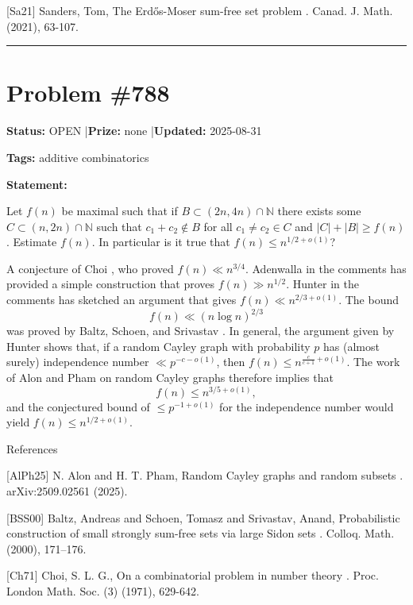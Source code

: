 \documentclass{article}
\begin{document}
[Sa21] Sanders, Tom, The Erd\H{o}s-Moser sum-free set problem . Canad. J. Math. (2021), 63-107.

\noindent\rule{\linewidth}{0.4pt}


\section{Problem \#788}
\label{prob:788}

\noindent\textbf{Status:} OPEN \quad|\quad \textbf{Prize:} none \quad|\quad \textbf{Updated:} 2025-08-31

\noindent\textbf{Tags:} additive combinatorics

\medskip

\noindent\textbf{Statement:}

Let $f(n)$ be maximal such that if $B\subset (2n,4n)\cap \mathbb{N}$ there exists some $C\subset (n,2n)\cap \mathbb{N}$ such that $c_1+c_2\not\in B$ for all $c_1\neq c_2\in C$ and $\lvert C\rvert+\lvert B\rvert \geq f(n)$. Estimate $f(n)$. In particular is it true that $f(n)\leq n^{1/2+o(1)}$?




A conjecture of Choi \cite{Ch71}, who proved $f(n) \ll n^{3/4}$. Adenwalla in the comments has provided a simple construction that proves $f(n) \gg n^{1/2}$. Hunter in the comments has sketched an argument that gives $f(n) \ll n^{2/3+o(1)}$. The bound\[f(n) \ll (n\log n)^{2/3}\]was proved by Baltz, Schoen, and Srivastav \cite{BSS00}. In general, the argument given by Hunter shows that, if a random Cayley graph with probability $p$ has (almost surely) independence number $\ll p^{-c-o(1)}$, then $f(n) \leq n^{\frac{c}{c+1}+o(1)}$. The work of Alon and Pham \cite{AlPh25} on random Cayley graphs therefore implies that\[f(n) \leq n^{3/5+o(1)},\]and the conjectured bound of $\leq p^{-1+o(1)}$ for the independence number would yield $f(n)\leq n^{1/2+o(1)}$.




References

[AlPh25] N. Alon and H. T. Pham, Random Cayley graphs and random subsets . arXiv:2509.02561 (2025).

[BSS00] Baltz, Andreas and Schoen, Tomasz and Srivastav, Anand, Probabilistic construction of small strongly sum-free sets via large Sidon sets . Colloq. Math. (2000), 171--176.

[Ch71] Choi, S. L. G., On a combinatorial problem in number theory . Proc. London Math. Soc. (3) (1971), 629-642.
\end{document}
